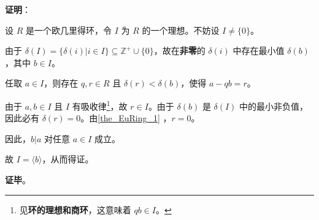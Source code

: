 \textbf{证明}：

设 $R$ 是一个欧几里得环，令 $I$ 为 $R$ 的一个理想。不妨设 $I\not=\{0\}$。

由于 $\delta(I)=\{\delta(i)|i\in I\}\subseteq\mathbb{Z}^+\cup\{0\}$，故在\textbf{非零}的 $\delta(i)$ 中存在最小值 $\delta(b)$，其中 $b\in I$。

任取 $a\in I$，则存在 $q, r\in R$ 且 $\delta(r)<\delta(b)$，使得 $a-qb=r$。

由于 $a, b\in I$ 且 $I$ 有吸收律\footnote{见\textbf{环的理想和商环}，这意味着 $qb\in I$。}，故 $r\in I$。由于 $\delta(b)$ 是 $\delta(I)$ 中的最小非负值，因此必有 $\delta(r)=0$。由\autoref{the_EuRing_1} ，$r=0$。

因此，$b|a$ 对任意 $a\in I$ 成立。

故 $I=\langle b \rangle$，从而得证。

\textbf{证毕}。



